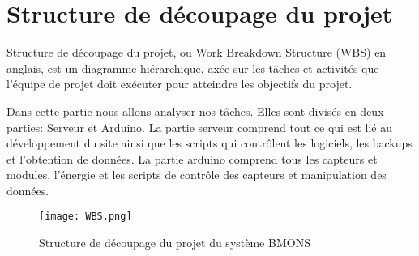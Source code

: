 \section{Structure de découpage du projet}

Structure de découpage du projet, ou Work Breakdown Structure (WBS) en anglais, est un diagramme hiérarchique, axée sur les tâches et activités que l’équipe de projet doit exécuter pour atteindre les objectifs du projet.

Dans cette partie nous allons analyser nos tâches. Elles sont divisés en deux parties: Serveur et Arduino. La partie serveur comprend tout ce qui est lié au développement du site ainsi que les scripts qui contrôlent les logiciels, les backups et l'obtention de données. La partie arduino comprend tous les capteurs et modules, l'énergie et les scripts de contrôle des capteurs et manipulation des données.  


\begin{figure}[h!]
\centering\texttt{[image: WBS.png]}
\caption{\label{fig:SDP} Structure de découpage du projet du système BMONS}
\end{figure}

\clearpage